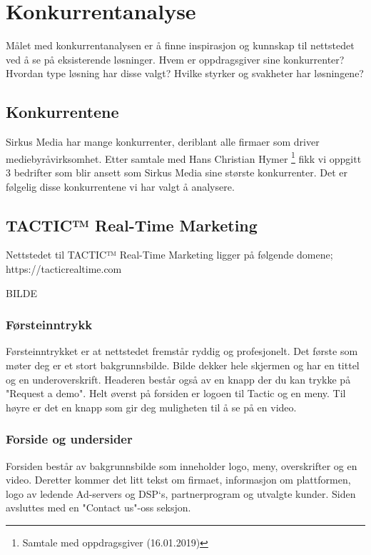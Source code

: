 \clearpage

\section{Konkurrentanalyse}

Målet med konkurrentanalysen er å finne inspirasjon og kunnskap til nettstedet ved å se på eksisterende løsninger. Hvem er oppdragsgiver sine konkurrenter? Hvordan type løsning har disse valgt? Hvilke styrker og svakheter har løsningene? 

\subsection{Konkurrentene}
Sirkus Media har mange konkurrenter, deriblant alle firmaer som driver mediebyråvirksomhet. Etter samtale med Hans Christian Hymer \footnote{Samtale med oppdragsgiver (16.01.2019)} fikk vi oppgitt 3 bedrifter som blir ansett som Sirkus Media sine største konkurrenter. Det er følgelig disse konkurrentene vi har valgt å analysere.

\subsection{TACTIC™ Real-Time Marketing}
Nettstedet til TACTIC™ Real-Time Marketing ligger på følgende domene; https://tacticrealtime.com

BILDE

\subsubsection{Førsteinntrykk}
Førsteinntrykket er at nettstedet fremstår ryddig og profesjonelt. Det første som møter deg er et stort bakgrunnsbilde. Bilde dekker hele skjermen og har en tittel og en underoverskrift. Headeren består også av en knapp der du kan trykke på "Request a demo". Helt øverst på forsiden er logoen til Tactic og en meny. Til høyre er det en knapp som gir deg muligheten til å se på en video. 

\subsubsection{Forside og undersider}

Forsiden består av bakgrunnsbilde som inneholder logo, meny, overskrifter og en video.  
Deretter kommer det litt tekst om firmaet, informasjon om plattformen, logo av ledende  Ad-servers og DSP`s, partnerprogram og utvalgte kunder. Siden avsluttes med en "Contact us"-oss seksjon.

